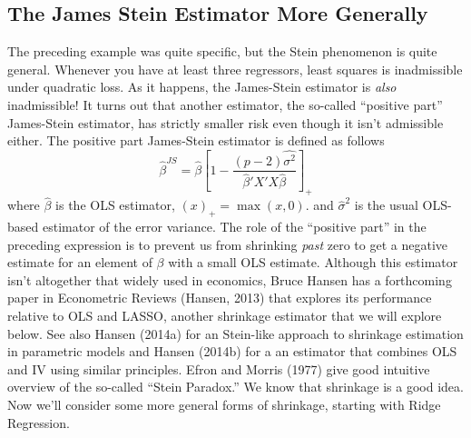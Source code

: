 \subsection{The James Stein Estimator More Generally}
The preceding example was quite specific, but the Stein phenomenon is quite general.
Whenever you have at least three regressors, least squares is inadmissible under quadratic loss.
As it happens, the James-Stein estimator is \emph{also} inadmissible!
It turns out that another estimator, the so-called ``positive part'' James-Stein estimator, has strictly smaller risk even though it isn't admissible either.
The positive part James-Stein estimator is defined as follows
$$\widehat{\beta}^{JS} = \widehat{\beta}\left[1 -\frac{(p-2)\widehat{\sigma^2}}{\widehat{\beta}'X'X \widehat{\beta}} \right]_+$$
where $\widehat{\beta}$ is the OLS estimator, $(x)_+ = \max(x,0)$.
and $\widehat{\sigma}^2$ is the usual OLS-based estimator of the error variance.
The role of the ``positive part'' in the preceding expression is to prevent us from shrinking \emph{past} zero to get a negative estimate for an element of $\beta$ with a small OLS estimate.
Although this estimator isn't altogether that widely used in economics, Bruce Hansen has a forthcoming paper in Econometric Reviews (Hansen, 2013) that explores its performance relative to OLS and LASSO, another shrinkage estimator that we will explore below.
See also Hansen (2014a) for an Stein-like approach to shrinkage estimation in parametric models and  Hansen (2014b) for a an estimator that combines OLS and IV using similar principles.
Efron and Morris (1977) give good intuitive overview of the so-called ``Stein Paradox.'' 
We know that shrinkage is a good idea. Now we'll consider some more general forms of shrinkage, starting with Ridge Regression.



